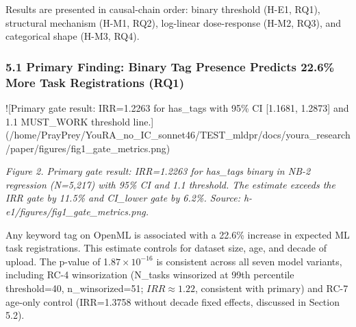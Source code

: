 
Results are presented in causal-chain order: binary threshold (H-E1, RQ1), structural mechanism (H-M1, RQ2), log-linear dose-response (H-M2, RQ3), and categorical shape (H-M3, RQ4).

\subsubsection{5.1 Primary Finding: Binary Tag Presence Predicts 22.6\% More Task Registrations (RQ1)}

![Primary gate result: IRR=1.2263 for has\_tags with 95\% CI [1.1681, 1.2873] and 1.1 MUST\_WORK threshold line.](/home/PrayPrey/YouRA\_no\_IC\_sonnet46/TEST\_mldpr/docs/youra\_research/paper/figures/fig1\_gate\_metrics.png)

\textit{Figure 2. Primary gate result: IRR=1.2263 for has\_tags binary in NB-2 regression (N=5,217) with 95\% CI and 1.1 threshold. The estimate exceeds the IRR gate by 11.5\% and CI\_lower gate by 6.2\%. Source: h-e1/figures/fig1\_gate\_metrics.png.}

\begin{table}[htbp]
\centering
{}
\end{table}

Any keyword tag on OpenML is associated with a 22.6\% increase in expected ML task registrations. This estimate controls for dataset size, age, and decade of upload. The p-value of 1.$87\times 10^{-16}$ is consistent across all seven model variants, including RC-4 winsorization (N\_tasks winsorized at 99th percentile threshold=40, n\_winsorized=51; $IRR\approx 1.22$, consistent with primary) and RC-7 age-only control (IRR=1.3758 without decade fixed effects, discussed in Section 5.2).

